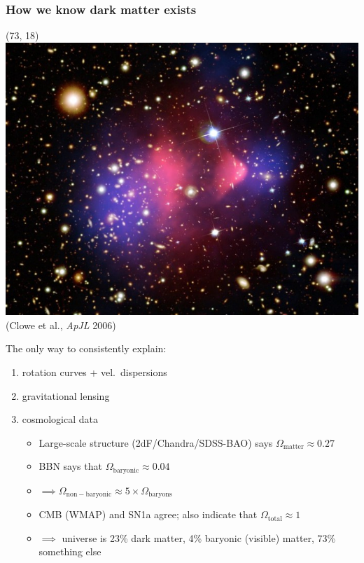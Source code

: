 \documentclass[xcolor=dvipsnames]{beamer}
\begin{document}
\begin{frame}
  \frametitle{How we know dark matter exists}
  \begin{textblock}{33}(73, 18)
    \includegraphics[width=\linewidth]{bullet_cluster}\\
    \tiny{(Clowe et al., \emph{ApJL} 2006)}
  \end{textblock}	
  
  \vspace{8mm}
  The only way to consistently explain:
  \begin{enumerate}
  \item
    rotation curves + vel.~dispersions
  \item
    gravitational lensing
  \item
    cosmological data
	\begin{itemize}  	
	\item    
		Large-scale structure (2dF/Chandra/SDSS-BAO) says $\Omega_\mathrm{matter}\approx 0.27$ 
	\item
		BBN says that $\Omega_\mathrm{baryonic} \approx 0.04$
        \item
                $\implies \Omega_\mathrm{non-baryonic} \approx 5 \times \Omega_\mathrm{baryons}$
        \item
                CMB (WMAP) and SN1a agree; also indicate that $\Omega_\mathrm{total}\approx 1$ 
	\item
		$\implies$ universe is 23\% dark matter, 4\% baryonic (visible) matter, 73\% something else
	\end{itemize}
  \end{enumerate}
\end{frame}
\end{document}
